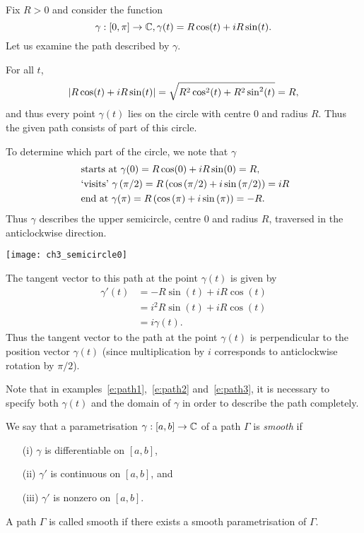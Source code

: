 \begin{example}
\label{e:path3}
Fix $R>0$ and consider the function
\[
\gamma:[0,\pi] \to \mathbb{C}, \gamma (t) = R \cos (t) + i R \sin (t).
\]
Let us examine the path described by $\gamma$.
\begin{blankbox}
For all $t$, 
\[ \left| R \cos(t)+iR \sin (t) \right| = \sqrt{R^2\cos^2(t)+R^2\sin^2 (t)} = R,
\]
and thus every point $\gamma(t)$ lies on the circle with centre $0$ and radius $R$.  Thus the given path consists of part of this circle.

To determine which part of the circle, we note that $\gamma$
\begin{align*}
& \text{ starts at } \gamma (0) = R\cos(0)+iR\sin(0)=R,\\
& \text{ `visits' }  \gamma \left( \pi /2 \right) = R \left( \cos \left( \pi / 2 \right) + i \sin \left( \pi / 2 \right) \right) = iR \\
& \text{ end at }  \gamma (\pi) = R \left( \cos \left( \pi \right) + i \sin \left( \pi \right) \right) = -R.
\end{align*}
Thus $\gamma$ describes the upper semicircle, centre $0$ and radius $R$, traversed in the anticlockwise direction.
\begin{center}
\texttt{[image: ch3\_semicircle0]}
\end{center}
The tangent vector to this path at the point $\gamma (t)$ is given by
\begin{align*}
\gamma '(t)& = -R \sin (t) + i R \cos (t) \\
& = i^2 R \sin (t)+iR \cos (t) \\
& = i \gamma (t).
\end{align*}
Thus the tangent vector to the path at the point $\gamma (t)$ is perpendicular to the position vector $\gamma(t)$ (since multiplication by $i$ corresponds to anticlockwise rotation by $\pi/2$).
\end{blankbox}
\end{example}

Note that in examples~\ref{e:path1},~\ref{e:path2} and~\ref{e:path3}, it is necessary to specify both $\gamma(t)$ and the domain of $\gamma$ in order to describe the path completely.  




\begin{definition}
 We say that a parametrisation $\gamma:[a,b] \to \mathbb{C}$ of a path $\Gamma$ is \emph{smooth} if
\begin{enumerate}
\item[(i)] $\gamma$ is differentiable on $[a,b]$,
\item[(ii)] $\gamma'$ is continuous on $[a,b]$, and
\item[(iii)] $\gamma' $ is nonzero on $[a,b]$.
\end{enumerate}
A path $\Gamma$ is called smooth if there exists a smooth parametrisation of $\Gamma$.  
\end{definition}

